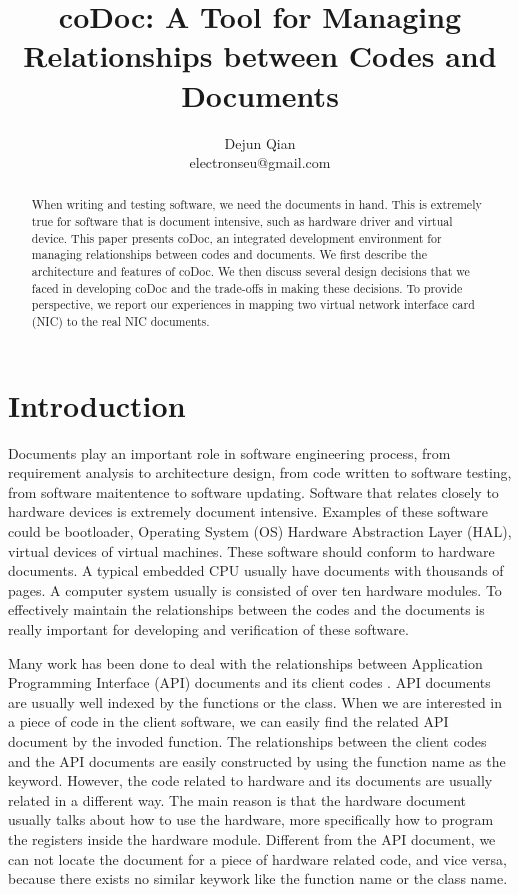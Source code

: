 \documentclass[11pt,letterpaper,oneside]{article}
\title{coDoc: A Tool for Managing Relationships between Codes and Documents}
\author{Dejun Qian\\electronseu@gmail.com}
\date{}
\begin{document}
\maketitle

\begin{abstract}
When writing and testing software, 
we need the documents in hand.
This is extremely true for software that is document intensive, 
such as hardware driver and virtual device.
This paper presents coDoc, 
an integrated development environment for managing relationships between codes and documents. 
We first describe the architecture and features of coDoc.
We then discuss several design decisions that we faced in developing coDoc and the trade-offs in making these decisions.
To provide perspective,
we report our experiences in mapping two virtual network interface card (NIC) to the real NIC documents.
\end{abstract}

\section{Introduction}
\label{sec:introduction}
Documents play an important role in software engineering process,
from requirement analysis to architecture design,
from code written to software testing,
from software maitentence to software updating.
Software that relates closely to hardware devices is extremely document intensive.
Examples of these software could be bootloader, 
Operating System (OS) Hardware Abstraction Layer (HAL),
virtual devices of virtual machines.
These software should conform to hardware documents.
A typical embedded CPU usually have documents with thousands of pages.
A computer system usually is consisted of over ten hardware modules.
To effectively maintain the relationships between the codes and the documents is really important for developing and verification of these software.

Many work has been done to deal with the relationships between Application Programming Interface (API) documents and its client codes \cite{Pandita_inferring_2012}.
API documents are usually well indexed by the functions or the class.
When we are interested in a piece of code in the client software,
we can easily find the related API document by the invoded function.
The relationships between the client codes and the API documents are easily constructed by using the function name as the keyword.
However, the code related to hardware and its documents are usually related in a different way.
The main reason is that the hardware document usually talks about how to use the hardware,
more specifically how to program the registers inside the hardware module.
Different from the API document,
we can not locate the document for a piece of hardware related code, and vice versa,
because there exists no similar keywork like the function name or the class name.
\end{document}
